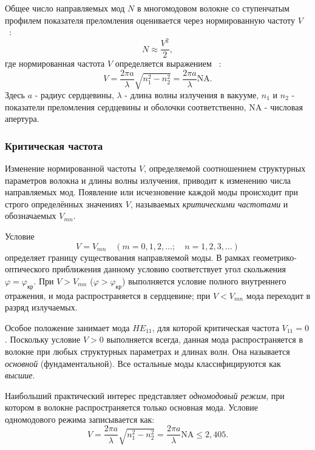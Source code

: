 Общее число направляемых мод $N$ в многомодовом волокне со ступенчатым профилем показателя преломления оценивается через нормированную частоту $V$ ~\cite{volokonno2012}:
\begin{equation}
    N \approx \frac{V^2}{2},
    \label{eq:N_modes}
\end{equation}
где нормированная частота $V$ определяется выражением ~\cite{velichansky2007}:
\begin{equation}
    V = \frac{2\pi a}{\lambda} \sqrt{n_1^2 - n_2^2} = \frac{2\pi a}{\lambda} \mathrm{NA}.
    \label{eq:V_number}
\end{equation}
Здесь $a$ - радиус сердцевины, $\lambda$ - длина волны излучения в вакууме, $n_1$ и $n_2$ - показатели преломления сердцевины и оболочки соответственно, $\mathrm{NA}$ - числовая апертура.

\subsubsection{Критическая частота }

Изменение нормированной частоты $V$, определяемой соотношением структурных параметров волокна и длины волны излучения, приводит к изменению числа направляемых мод. Появление или исчезновение каждой моды происходит при строго определённых значениях $V$, называемых \textit{критическими частотами} и обозначаемых $V_{mn}$.

Условие
\begin{equation}
    V = V_{mn} \quad (m = 0, 1, 2, \dots; \quad n = 1, 2, 3, \dots)
    \label{eq:Vmn}
\end{equation}
определяет границу существования направляемой моды. В рамках геометрико-оптического приближения данному условию соответствует угол скольжения $\varphi = \varphi_\text{кр}$. При $V > V_{mn}$ ($\varphi > \varphi_\text{кр}$) выполняется условие полного внутреннего отражения, и мода распространяется в сердцевине; при $V < V_{mn}$ мода переходит в разряд излучаемых.

Особое положение занимает мода $HE_{11}$, для которой критическая частота $V_{11} = 0$. Поскольку условие $V > 0$ выполняется всегда, данная мода распространяется в волокне при любых структурных параметрах и длинах волн. Она называется \textit{основной} (фундаментальной). Все остальные моды классифицируются как \textit{высшие}.

Наибольший практический интерес представляет \textit{одномодовый режим}, при котором в волокне распространяется только основная мода. Условие одномодового режима записывается как:
\begin{equation}
    V = \frac{2\pi a}{\lambda}\sqrt{n_1^2 - n_2^2} = \frac{2\pi a}{\lambda}\mathrm{NA} \leq 2{,}405.
    \label{eq:single_mode}
\end{equation}

